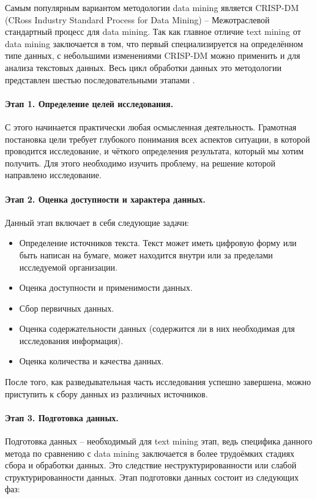 Самым популярным вариантом методологии data mining является CRISP-DM (CRoss Industry Standard Process for Data Mining) -- Межотраслевой стандартный процесс для data mining. Так как главное отличие text mining от data mining заключается в том, что первый специализируется на определённом типе данных, с небольшими изменениями CRISP-DM можно применить и для анализа текстовых данных. Весь цикл обработки данных это методологии представлен шестью последовательными этапами \cite[стр. 74]{practical_tm}.

\paragraph{Этап 1. Определение целей исследования.} С этого начинается практически любая осмысленная деятельность. Грамотная постановка цели требует глубокого понимания всех аспектов ситуации, в которой проводится исследование, и чёткого определения результата, который мы хотим получить. Для этого необходимо изучить проблему, на решение которой направлено исследование.

\paragraph{Этап 2. Оценка доступности и характера данных.} Данный этап включает в себя следующие задачи: 
	\begin{itemize}
	\item Определение источников текста. Текст может иметь цифровую форму или быть написан на бумаге, может находится внутри или за пределами исследуемой организации.
	\item Оценка доступности и применимости данных.
	\item Сбор первичных данных.
	\item Оценка содержательности данных (содержится ли в них необходимая для исследования информация).
	\item Оценка количества и качества данных. 
	\end{itemize}

После того, как разведывательная часть исследования успешно завершена, можно приступить к сбору данных из различных источников.

\paragraph{Этап 3. Подготовка данных.} Подготовка данных -- необходимый для text mining этап, ведь специфика данного метода по сравнению с data mining заключается в более трудоёмких стадиях сбора и обработки данных\cite[стр. 77]{practical_tm}. Это следствие неструктурированности или слабой структурированности данных. Этап подготовки данных состоит из следующих фаз:


